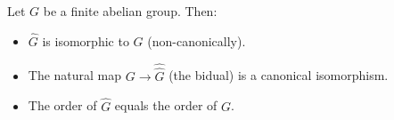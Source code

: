 Let $G$ be a finite abelian group. Then:
\begin{itemize}
\item[(i)] $\widehat{G}$ is isomorphic to $G$ (non-canonically).
\item[(ii)] The natural map $G \to \widehat{\widehat{G}}$ (the bidual) is a canonical isomorphism.
\item[(iii)] The order of $\widehat{G}$ equals the order of $G$.
\end{itemize}
